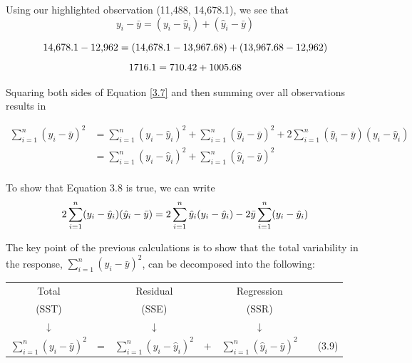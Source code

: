 \documentclass[
]{report}
\begin{document}
Using our highlighted observation (11,488, 14,678.1), we see that
\begin{equation}\label{3.7}
y_i - \bar{y} = (y_i - \hat{y}_i) + (\hat{y}_i - \bar{y}) 
\tag{3.7}
\end{equation}

\begin{equation}
14{,}678.1 - 12{,}962 = (14{,}678.1 - 13{,}967.68) + (13{,}967.68 - 12{,}962) \notag
\end{equation}
\begin{equation}
1716.1 = 710.42 + 1005.68 \notag
\end{equation}

Squaring both sides of Equation \ref{3.7} and then summing over all observations results in

\begin{align}\label{eq:SumSquares}
\sum_{i=1}^n (y_i - \bar{y})^2 
  &= \sum_{i=1}^n (y_i - \hat{y}_i)^2
  + \sum_{i=1}^n (\hat{y}_i - \bar{y})^2
  + 2 \sum_{i=1}^n (\hat{y}_i - \bar{y})(y_i - \hat{y}_i) \\[6pt] 
  &= \sum_{i=1}^n (y_i - \hat{y}_i)^2 + \sum_{i=1}^n (\hat{y}_i - \bar{y})^2 \\[6pt] \tag{3.8}
\end{align}

To show that Equation 3.8 is true, we can write
\begin{equation}
2 \sum_{i=1}^n (y_i - \hat{y}_i)(\hat{y}_i - \bar{y})
  = 2 \sum_{i=1}^n \hat{y}_i (y_i - \hat{y}_i)
  - 2 \bar{y} \sum_{i=1}^n (y_i - \hat{y}_i) \notag
\end{equation}

The key point of the previous calculations is to show that the total variability in the response, \(\sum_{i=1}^n (y_i - \bar{y})^2\), can be decomposed into the following:

\begin{table}
\centering
\begin{tabular}{>{}c>{}c>{}c>{}c>{}c>{}c>{}c}
\toprule
Total &  & Residual &  & Regression &  & \\
(SST) &  & (SSE) &  & (SSR) &  & \\
↓ &  & ↓ &  & ↓ &  & \\
$\sum_{i=1}^n (y_i - \bar{y})^2$ & = & $\sum_{i=1}^n (y_i - \hat{y}_i)^2$ & $+$ & $\sum_{i=1}^n (\hat{y}_i - \bar{y})^2$ &  & (3.9)\\
\bottomrule
\end{tabular}
\end{table}
\end{document}
